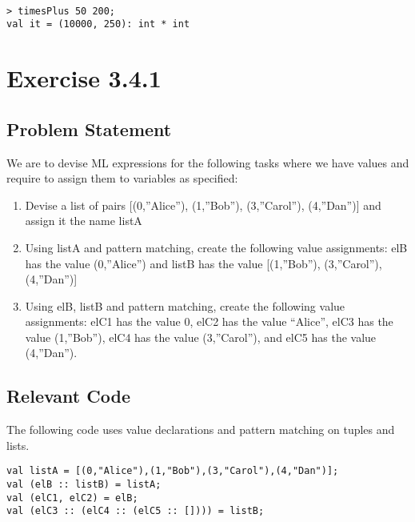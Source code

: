 \documentclass{report}
\begin{document}
\begin{session}
\begin{scriptsize}
\begin{verbatim}

> timesPlus 50 200;
val it = (10000, 250): int * int 
\end{verbatim}
\end{scriptsize}
\end{session}

\chapter{Exercise 3.4.1}
\label{cha:exercise-3.4.1}

\section{Problem Statement}
\label{sec:problem-statement-1}
We are to devise ML expressions for the following tasks where we have 
values and require to assign them to variables as specified:
\begin{enumerate}[{1.}] %
\item Devise a list of pairs [(0,''Alice''), (1,''Bob''),
  (3,''Carol''), (4,''Dan'')] and assign it the name listA
\item Using listA and pattern matching, create the following value
  assignments: elB has the value (0,''Alice'') and listB has the value
  [(1,''Bob''), (3,''Carol''), (4,''Dan'')]
\item Using elB, listB and pattern matching, create the following
  value assignments: elC1 has the value 0, elC2 has the value
  ``Alice'', elC3 has the value (1,''Bob''), elC4 has the value
  (3,''Carol''), and elC5 has the value (4,''Dan'').
\end{enumerate}

\section{Relevant Code}
\label{sec:relevant-code-1}

The following code uses value declarations and pattern
matching on tuples and lists.

\lstset{frameround=tftf}
\begin{lstlisting}[frame=trbl]
val listA = [(0,"Alice"),(1,"Bob"),(3,"Carol"),(4,"Dan")]; 
val (elB :: listB) = listA; 
val (elC1, elC2) = elB; 
val (elC3 :: (elC4 :: (elC5 :: []))) = listB;
\end{lstlisting}
\end{document}
